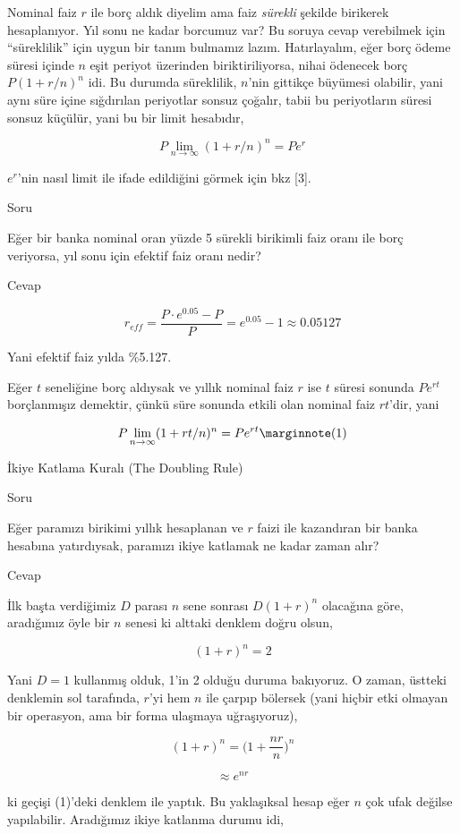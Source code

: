 \documentclass[12pt,fleqn]{article}\usepackage{../../common}
\begin{document}
Nominal faiz $r$ ile borç aldık diyelim ama faiz {\em sürekli} şekilde birikerek
hesaplanıyor. Yıl sonu ne kadar borcumuz var? Bu soruya cevap verebilmek için
``süreklilik'' için uygun bir tanım bulmamız lazım. Hatırlayalım, eğer borç
ödeme süresi içinde $n$ eşit periyot üzerinden biriktiriliyorsa, nihai ödenecek
borç $P(1+r/n)^n$ idi. Bu durumda süreklilik, $n$'nin gittikçe büyümesi
olabilir, yani aynı süre içine sığdırılan periyotlar sonsuz çoğalır, tabii bu
periyotların süresi sonsuz küçülür, yani bu bir limit hesabıdır,

$$ P \lim_{n \to \infty} (1+r/n)^n = Pe^r $$

$e^r$'nin nasıl limit ile ifade edildiğini görmek için bkz [3]. 

Soru

Eğer bir banka nominal oran yüzde 5 sürekli birikimli faiz oranı ile borç
veriyorsa, yıl sonu için efektif faiz oranı nedir?

Cevap

$$ r_{eff} = \frac{P\cdot e^{0.05} - P}{P} = e^{0.05} - 1 \approx 0.05127  $$

Yani efektif faiz yılda \%5.127. 

Eğer $t$ seneliğine borç aldıysak ve yıllık nominal faiz $r$ ise $t$ süresi
sonunda $Pe^{rt}$ borçlanmışız demektir, çünkü süre sonunda etkili olan nominal
faiz $rt$'dir, yani

$$ P \lim_{n \to \infty} (1 + rt / n)^n = Pe^{rt}
\mlabel{1}
$$

İkiye Katlama Kuralı (The Doubling Rule)

Soru

Eğer paramızı birikimi yıllık hesaplanan ve $r$ faizi ile kazandıran bir banka
hesabına yatırdıysak, paramızı ikiye katlamak ne kadar zaman alır?

Cevap

İlk başta verdiğimiz $D$ parası $n$ sene sonrası $D(1+r)^n$ olacağına göre,
aradığımız öyle bir $n$ senesi ki alttaki denklem doğru olsun,

$$ (1+r)^n = 2 $$

Yani $D=1$ kullanmış olduk, 1'in 2 olduğu duruma bakıyoruz. O zaman, üstteki
denklemin sol tarafında, $r$'yi hem $n$ ile çarpıp bölersek (yani hiçbir etki
olmayan bir operasyon, ama bir forma ulaşmaya uğraşıyoruz),

$$ (1+r)^n = \bigg( 1 + \frac{nr}{n} \bigg)^n  $$

$$ \approx e^{nr} $$

ki geçişi (1)'deki denklem ile yaptık. Bu yaklaşıksal hesap eğer $n$ çok ufak
değilse yapılabilir. Aradığımız ikiye katlanma durumu idi,
\end{document}
